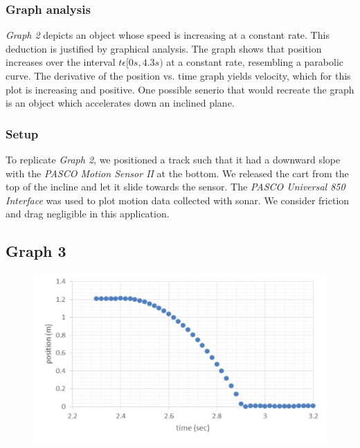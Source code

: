 \documentclass[11pt, letterpaper, includehead]{article}
\begin{document}
  \subsubsection{Graph analysis}
  \emph{Graph 2} depicts an object whose speed is increasing at a constant rate. This deduction is 
  justified by graphical analysis. The graph shows that position increases over the interval 
  $t\epsilon[0s, 4.3s)$ at a constant rate, resembling a parabolic curve. The derivative of the 
  position vs. time graph yields velocity, which for this plot is increasing and positive. One 
  possible senerio that would recreate the graph is an object which accelerates down an inclined plane.\\
  
  \subsubsection{Setup}
  To replicate \emph{Graph 2}, we positioned a track such that it had a downward slope with the 
  \emph{PASCO Motion Sensor II} at the bottom. We released the cart from the top of the incline 
  and let it slide towards the sensor. The \emph{PASCO Universal 850 Interface} was used 
  to plot motion data collected with sonar. We consider friction and drag negligible in 
  this application.
  
  \subsection{Graph 3}

  \begin{figure}[H] %
    \centering 
    \includegraphics[width=\linewidth]{graph_3.png}
  \end{figure}
\end{document}
